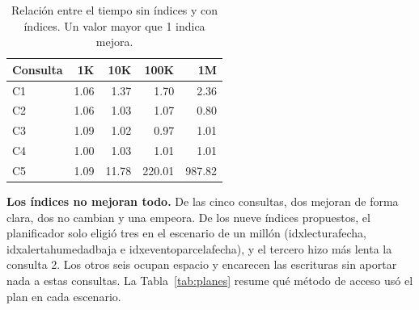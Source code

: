 \documentclass[11pt,letterpaper]{article}
\newcommand{\tbus}{\textunderscore\allowbreak}
\newcommand{\tb}[1]{{\ttfamily\let\_\tbus #1}}
\begin{document}
\begin{table}[H]
\centering\small
\begin{tabular}{lrrrr}
\toprule
Consulta & 1K & 10K & 100K & 1M \\
\midrule
C1 & 1.06 & 1.37 & 1.70 & 2.36 \\
C2 & 1.06 & 1.03 & 1.07 & 0.80 \\
C3 & 1.09 & 1.02 & 0.97 & 1.01 \\
C4 & 1.00 & 1.03 & 1.01 & 1.01 \\
C5 & 1.09 & 11.78 & 220.01 & 987.82 \\
\bottomrule
\end{tabular}
\caption{Relación entre el tiempo sin índices y con índices. Un valor mayor que 1 indica mejora.}\label{tab:resumen}
\end{table}


\textbf{Los índices no mejoran todo.} De las cinco consultas, dos mejoran de forma clara, dos no cambian y una empeora. De los nueve índices propuestos, el planificador solo eligió tres en el escenario de un millón (\tb{idx\_lectura\_fecha}, \tb{idx\_alerta\_humedad\_baja} e \tb{idx\_evento\_parcela\_fecha}), y el tercero hizo más lenta la consulta 2. Los otros seis ocupan espacio y encarecen las escrituras sin aportar nada a estas consultas. La Tabla~\ref{tab:planes} resume qué método de acceso usó el plan en cada escenario.
\end{document}
